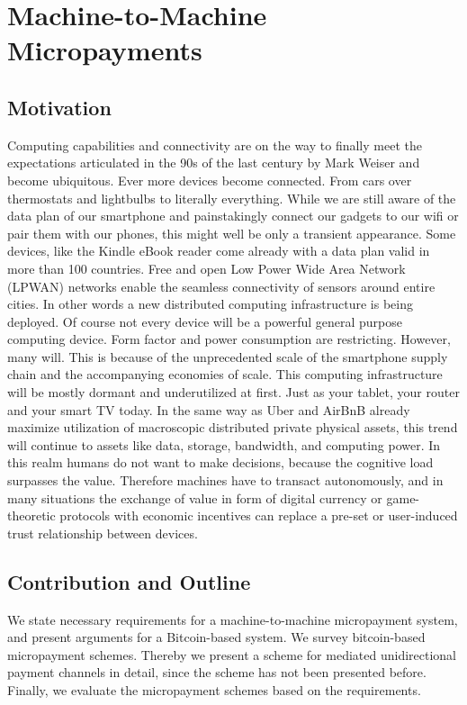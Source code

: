 
\chapter{Machine-to-Machine Micropayments}

\section{Motivation}

Computing capabilities and connectivity are on the way to finally meet the expectations articulated in the 90s of the last century by Mark Weiser and become ubiquitous. Ever more devices become connected. From cars over thermostats and lightbulbs to literally everything. While we are still aware of the data plan of our smartphone and painstakingly connect our gadgets to our wifi or pair them with our phones, this might well be only a transient appearance. Some devices, like the Kindle eBook reader come already with a data plan valid in more than 100 countries. Free and open Low Power Wide Area Network (LPWAN) networks enable the seamless connectivity of sensors around entire cities. In other words a new distributed computing infrastructure is being deployed. Of course not every device will be a powerful general purpose computing device. Form factor and power consumption are restricting. However, many will. This is because of the unprecedented scale of the smartphone supply chain and the accompanying economies of scale. This computing infrastructure will be mostly dormant and underutilized at first. Just as your tablet, your router and your smart TV today. In the same way as Uber and AirBnB already maximize utilization of macroscopic distributed private physical assets, this trend will continue to assets like data, storage, bandwidth, and computing power. 
In this realm humans do not want to make decisions, because the cognitive load surpasses the value. Therefore machines have to transact autonomously, and in many situations the exchange of value in form of digital currency or game-theoretic protocols with economic incentives can replace a pre-set or user-induced trust relationship between devices. 

\section{Contribution and Outline}

We state necessary requirements for a machine-to-machine micropayment system, and present arguments for a Bitcoin-based system. We survey bitcoin-based micropayment schemes. Thereby we present a scheme for mediated unidirectional payment channels in detail, since the scheme has not been presented before.
Finally, we evaluate the micropayment schemes based on the requirements.


